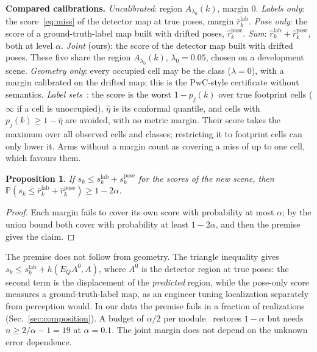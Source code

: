 \documentclass[conference]{IEEEtran}
\newtheorem{proposition}{Proposition}
\theoremstyle{definition}
\begin{document}
\textbf{Compared calibrations.} \emph{Uncalibrated}: region $A_{\lambda_0}(k)$, margin 0. \emph{Labels only}: the
score~\eqref{eq:miss} of the detector map at true poses, margin $\hat r^{\mathrm{lab}}_k$. \emph{Pose only}: the score
of a ground-truth-label map built with drifted poses, $\hat r^{\mathrm{pose}}_k$. \emph{Sum}:
$\hat r^{\mathrm{lab}}_k + \hat r^{\mathrm{pose}}_k$, both at level $\alpha$. \emph{Joint} (ours): the score of the
detector map built with drifted poses. These five share the region $A_{\lambda_0}(k)$, $\lambda_0 = 0.05$, chosen on a
development scene. \emph{Geometry only}: every occupied cell may be the class ($\lambda = 0$), with a margin calibrated on
the drifted map; this is the PwC-style certificate without semantics. \emph{Label sets}~\cite{sundarsingh}: the score is
the worst $1 - p_j(k)$ over true footprint cells ($\infty$ if a cell is unoccupied), $\hat\eta$ is its conformal
quantile, and cells with $p_j(k) \ge 1 - \hat\eta$ are avoided, with no metric margin. Their score takes the maximum over
all observed cells and classes; restricting it to footprint cells can only lower it. Arms without a margin count as
covering a miss of up to one cell, which favours them.

\begin{proposition}\label{prop:sep}
If $s_k \le s^{\mathrm{lab}}_k + s^{\mathrm{pose}}_k$ for the scores of the new scene, then
$\mathbb P(s_k \le \hat r^{\mathrm{lab}}_k + \hat r^{\mathrm{pose}}_k) \ge 1 - 2\alpha$.
\end{proposition}
\begin{proof}
Each margin fails to cover its own score with probability at most $\alpha$; by the union bound both cover with
probability at least $1 - 2\alpha$, and then the premise gives the claim.
\end{proof}

The premise does not follow from geometry. The triangle inequality gives
$s_k \le s^{\mathrm{lab}}_k + h(E_Q A^0, A)$, where $A^0$ is the detector region at true poses: the second term is the
displacement of the \emph{predicted} region, while the pose-only score measures a ground-truth-label map, as an engineer
tuning localization separately from perception would. In our data the premise fails in a fraction of realizations
(Sec.~\ref{sec:composition}). A budget of $\alpha/2$ per module~\cite{calafiore2026} restores $1 - \alpha$ but needs
$n \ge 2/\alpha - 1 = 19$ at $\alpha = 0.1$. The joint margin does not depend on the unknown error dependence.
\end{document}
